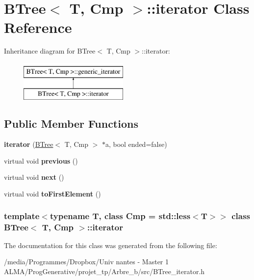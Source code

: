 \hypertarget{classBTree_1_1iterator}{
\section{BTree$<$ T, Cmp $>$::iterator Class Reference}
\label{classBTree_1_1iterator}
}
Inheritance diagram for BTree$<$ T, Cmp $>$::iterator:\begin{figure}[H]
\begin{center}
\leavevmode
\includegraphics[height=2.000000cm]{classBTree_1_1iterator}
\end{center}
\end{figure}
\subsection*{Public Member Functions}
\begin{DoxyCompactItemize}
\item 
\hypertarget{classBTree_1_1iterator_ad34e487a9baf267daabe0dda42315553}{
{\bfseries iterator} (\hyperlink{classBTree}{BTree}$<$ T, Cmp $>$ $\ast$a, bool ended=false)}
\label{classBTree_1_1iterator_ad34e487a9baf267daabe0dda42315553}

\item 
\hypertarget{classBTree_1_1iterator_a539a8aec03bc81a5bbaf975ba56e5244}{
virtual void {\bfseries previous} ()}
\label{classBTree_1_1iterator_a539a8aec03bc81a5bbaf975ba56e5244}

\item 
\hypertarget{classBTree_1_1iterator_a993861d40f5da583f3c5af5db925c194}{
virtual void {\bfseries next} ()}
\label{classBTree_1_1iterator_a993861d40f5da583f3c5af5db925c194}

\item 
\hypertarget{classBTree_1_1iterator_a01fd8287c1734bdf5f16bdf03a593587}{
virtual void {\bfseries toFirstElement} ()}
\label{classBTree_1_1iterator_a01fd8287c1734bdf5f16bdf03a593587}

\end{DoxyCompactItemize}
\subsubsection*{template$<$typename T, class Cmp = std::less$<$T$>$$>$ class BTree$<$ T, Cmp $>$::iterator}



The documentation for this class was generated from the following file:\begin{DoxyCompactItemize}
\item 
/media/Programmes/Dropbox/Univ nantes -\/ Master 1 ALMA/ProgGenerative/projet\_\-tp/Arbre\_\-b/src/BTree\_\-iterator.h\end{DoxyCompactItemize}
